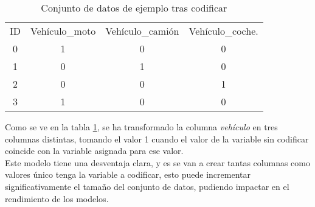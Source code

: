 \begin{table}[H]
	\centering
	\begin{tabular}{|c|c|c|c|}
		\cline{1-4}
		ID & Vehículo\_moto & Vehículo\_camión & Vehículo\_coche. \\ \cline{1-4}
		0  & 1              & 0                & 0                \\ \cline{1-4}
		1  & 0              & 1                & 0                \\ \cline{1-4}
		2  & 0              & 0                & 1                \\ \cline{1-4}
		3  & 1              & 0                & 0                \\ \cline{1-4}
	\end{tabular}
	\caption{Conjunto de datos de ejemplo tras codificar}
	\label{tab:conjunto_ejemplo_cod}
\end{table}
Como se ve en la tabla \ref{tab:conjunto_ejemplo_cod}, se ha transformado la columna \textit{vehículo} en tres columnas distintas, tomando el valor 1 cuando el valor de la variable sin codificar coincide con la variable asignada para ese valor. \\
\linebreak
Este modelo tiene una desventaja clara, y es se van a crear tantas columnas como valores único tenga la variable a codificar, esto puede incrementar significativamente el tamaño del conjunto de datos, pudiendo impactar en el rendimiento de los modelos.
